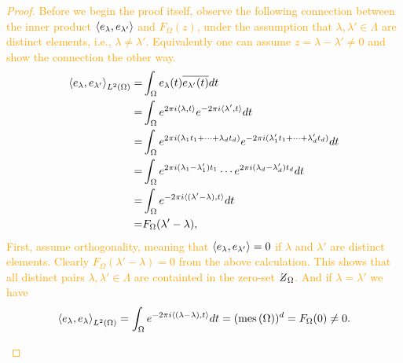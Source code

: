 \documentclass[../thesis.tex]{subfiles}
\begin{document}
\textcolor{orange}{  %
\begin{proof}
    Before we begin the proof itself, observe the following connection between the inner product $\left \langle e_{\lambda},e_{\lambda'}  \right \rangle$ and $F_{\Omega}(z)$, under the assumption that $\lambda,\lambda'\in \Lambda$ are distinct elements, i.e., $\lambda \neq \lambda'$. Equivalently one can assume $z = \lambda - \lambda' \neq0$ and show the connection the other way.  %
    \begin{align*}
        \left \langle e_{\lambda},e_{\lambda'}  \right \rangle_{L^2(\Omega)} =& \int_{\Omega} e_{\lambda}(t)\overline{e_{\lambda'}(t)} dt\\
        =& \int_{\Omega} e^{2\pi i \langle\lambda,t\rangle} e^{-2 \pi i \langle\lambda',t\rangle} dt\\
        =& \int_{\Omega} e^{2\pi i  (\lambda_1t_1 + \dots +\lambda_d t_d)} e^{-2\pi i  (\lambda_1' t_1 + \dots +\lambda_d' t_d)} dt\\
        =& \int_{\Omega} e^{2\pi i  (\lambda_1 -\lambda_1')t_1} \cdots e^{2\pi i  (\lambda_d -\lambda_d')t_d} dt\\
        =&\int_{\Omega} e^{-2 \pi i \langle(\lambda'-\lambda),t\rangle} dt\\
        =& F_{\Omega} (\lambda'-\lambda),
    \end{align*}
    First, assume orthogonality, meaning that $\left \langle e_{\lambda},e_{\lambda'}  \right \rangle = 0 $ if $\lambda$ and $\lambda'$ are distinct elements. Clearly $F_{\Omega}(\lambda'-\lambda) = 0$ from the above calculation. This shows that all distinct pairs $\lambda,\lambda'\in\Lambda$ are containted in the zero-set $\Zstroke_{\Omega}$. And if $\lambda = \lambda'$ we have  %
    \begin{equation*}
        \left \langle e_{\lambda},e_{\lambda}  \right \rangle_{L^2(\Omega)} =\int_{\Omega} e^{-2 \pi i \langle(\lambda-\lambda),t\rangle} dt = (\operatorname{mes}\left(\Omega\right))^d = F_{\Omega}(0) \neq 0.
    \end{equation*}
    \begin{align*}

\end{align*}
\end{proof}}
\end{document}
